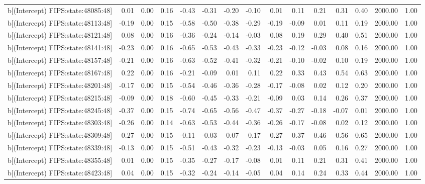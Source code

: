 \begin{table}[ht]
\begin{tabular}{rrrrrrrrrrrrrrr}
  b[(Intercept) FIPS:state:48085:48] & 0.01 & 0.00 & 0.16 & -0.43 & -0.31 & -0.20 & -0.10 & 0.01 & 0.11 & 0.21 & 0.31 & 0.40 & 2000.00 & 1.00 \\ 
  b[(Intercept) FIPS:state:48113:48] & -0.19 & 0.00 & 0.15 & -0.58 & -0.50 & -0.38 & -0.29 & -0.19 & -0.09 & 0.01 & 0.11 & 0.19 & 2000.00 & 1.00 \\ 
  b[(Intercept) FIPS:state:48121:48] & 0.08 & 0.00 & 0.16 & -0.36 & -0.24 & -0.14 & -0.03 & 0.08 & 0.19 & 0.29 & 0.40 & 0.51 & 2000.00 & 1.00 \\ 
  b[(Intercept) FIPS:state:48141:48] & -0.23 & 0.00 & 0.16 & -0.65 & -0.53 & -0.43 & -0.33 & -0.23 & -0.12 & -0.03 & 0.08 & 0.16 & 2000.00 & 1.00 \\ 
  b[(Intercept) FIPS:state:48157:48] & -0.21 & 0.00 & 0.16 & -0.63 & -0.52 & -0.41 & -0.32 & -0.21 & -0.10 & -0.02 & 0.10 & 0.19 & 2000.00 & 1.00 \\ 
  b[(Intercept) FIPS:state:48167:48] & 0.22 & 0.00 & 0.16 & -0.21 & -0.09 & 0.01 & 0.11 & 0.22 & 0.33 & 0.43 & 0.54 & 0.63 & 2000.00 & 1.00 \\ 
  b[(Intercept) FIPS:state:48201:48] & -0.17 & 0.00 & 0.15 & -0.54 & -0.46 & -0.36 & -0.28 & -0.17 & -0.08 & 0.02 & 0.12 & 0.20 & 2000.00 & 1.00 \\ 
  b[(Intercept) FIPS:state:48215:48] & -0.09 & 0.00 & 0.18 & -0.60 & -0.45 & -0.33 & -0.21 & -0.09 & 0.03 & 0.14 & 0.26 & 0.37 & 2000.00 & 1.00 \\ 
  b[(Intercept) FIPS:state:48245:48] & -0.37 & 0.00 & 0.15 & -0.74 & -0.65 & -0.56 & -0.47 & -0.37 & -0.27 & -0.18 & -0.07 & 0.01 & 2000.00 & 1.00 \\ 
  b[(Intercept) FIPS:state:48303:48] & -0.26 & 0.00 & 0.14 & -0.63 & -0.53 & -0.44 & -0.36 & -0.26 & -0.17 & -0.08 & 0.02 & 0.12 & 2000.00 & 1.00 \\ 
  b[(Intercept) FIPS:state:48309:48] & 0.27 & 0.00 & 0.15 & -0.11 & -0.03 & 0.07 & 0.17 & 0.27 & 0.37 & 0.46 & 0.56 & 0.65 & 2000.00 & 1.00 \\ 
  b[(Intercept) FIPS:state:48339:48] & -0.13 & 0.00 & 0.15 & -0.51 & -0.43 & -0.32 & -0.23 & -0.13 & -0.03 & 0.05 & 0.16 & 0.27 & 2000.00 & 1.00 \\ 
  b[(Intercept) FIPS:state:48355:48] & 0.01 & 0.00 & 0.15 & -0.35 & -0.27 & -0.17 & -0.08 & 0.01 & 0.11 & 0.21 & 0.31 & 0.41 & 2000.00 & 1.00 \\ 
  b[(Intercept) FIPS:state:48423:48] & 0.04 & 0.00 & 0.15 & -0.32 & -0.24 & -0.14 & -0.05 & 0.04 & 0.14 & 0.24 & 0.33 & 0.44 & 2000.00 & 1.00 \\ 

\end{tabular}
\end{table}
